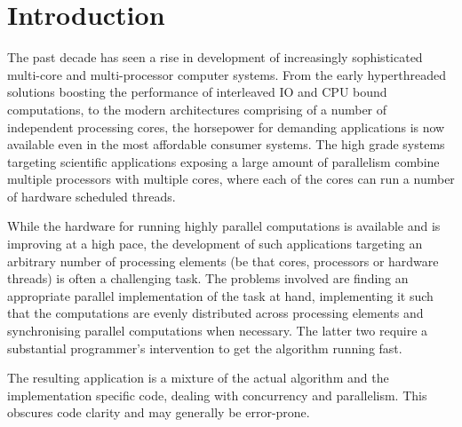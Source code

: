 \documentclass[preamble.tex]{subfiles}
\begin{document}
\pagebreak

\chapter{Introduction}

The past decade has seen a rise in development of increasingly sophisticated multi-core and multi-processor computer systems. From the early hyperthreaded solutions boosting the performance of interleaved IO and CPU bound computations, to the modern architectures comprising of a number of independent processing cores, the horsepower for demanding applications is now available even in the most affordable consumer systems. The high grade systems targeting scientific applications exposing a large amount of parallelism combine multiple processors with multiple cores, where each of the cores can run a number of hardware scheduled threads.

While the hardware for running highly parallel computations is available and is improving at a high pace, the development of such applications targeting an arbitrary number of processing elements (be that cores, processors or hardware threads) is often a challenging task. The problems involved are finding an appropriate parallel implementation of the task at hand, implementing it such that the computations are evenly distributed across processing elements and synchronising parallel computations when necessary. The latter two require a substantial programmer's intervention to get the algorithm running fast. %

The resulting application is a mixture of the actual algorithm and the implementation specific code, dealing with concurrency and parallelism. This obscures code clarity and may generally be error-prone.
\end{document}

